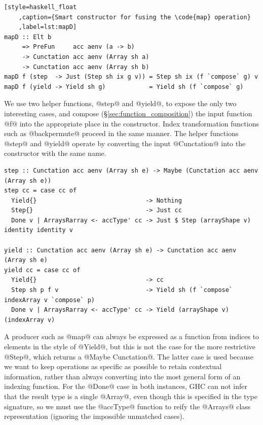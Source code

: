 \begin{lstlisting}[style=haskell_float
    ,caption={Smart constructor for fusing the \code{map} operation}
    ,label=lst:mapD]
mapD :: Elt b
     => PreFun     acc aenv (a -> b)
     -> Cunctation acc aenv (Array sh a)
     -> Cunctation acc aenv (Array sh b)
mapD f (step  -> Just (Step sh ix g v)) = Step sh ix (f `compose` g) v
mapD f (yield -> Yield sh g)            = Yield sh (f `compose` g)
\end{lstlisting}

We use two helper functions, @step@ and @yield@, to expose the only
two interesting cases, and compose (\S\ref{sec:function_composition}) the
input function @f@ into the appropriate place in the constructor. Index
transformation functions such as @backpermute@ proceed in the same manner.
The helper functions @step@ and @yield@ operate by converting the input
@Cunctation@ into the constructor with the same name.
%
\begin{lstlisting}[style=haskell]
step :: Cunctation acc aenv (Array sh e) -> Maybe (Cunctation acc aenv (Array sh e))
step cc = case cc of
  Yield{}                              -> Nothing
  Step{}                               -> Just cc
  Done v | ArraysRarray <- accType' cc -> Just $ Step (arrayShape v) identity identity v

yield :: Cunctation acc aenv (Array sh e) -> Cunctation acc aenv (Array sh e)
yield cc = case cc of
  Yield{}                              -> cc
  Step sh p f v                        -> Yield sh (f `compose` indexArray v `compose` p)
  Done v | ArraysRarray <- accType' cc -> Yield (arrayShape v) (indexArray v)
\end{lstlisting}

A producer such as @map@ can always be expressed as a function from indices to
elements in the style of @Yield@, but this is not the case for the more
restrictive @Step@, which returns a @Maybe Cunctation@. The latter case is used
because we want to keep operations as specific as possible to retain contextual
information, rather than always converting into the most general form of an
indexing function. For the @Done@ case in both instances, GHC can not infer that
the result type is a single @Array@, even though this is specified in the type
signature, so we must use the @accType@ function to reify the @Arrays@ class
representation (ignoring the impossible unmatched cases).

